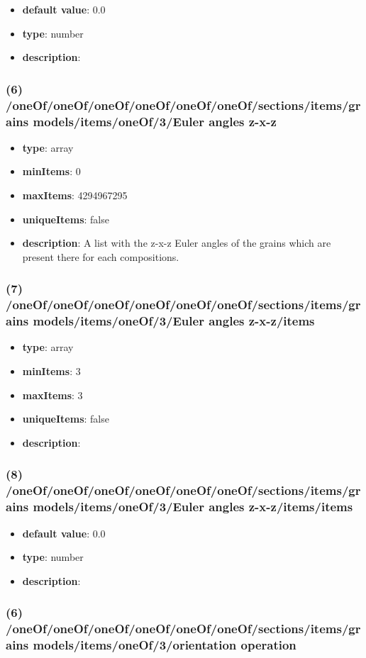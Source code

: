 \begin{itemize}[leftmargin=9em]\item {\bf default value}: 0.0
\item {\bf type}: number
\item {\bf description}: 
\end{itemize}\subsubsection{(6) /oneOf/oneOf/oneOf/oneOf/oneOf/oneOf/sections/items/grains models/items/oneOf/3/Euler angles z-x-z}
\begin{itemize}[leftmargin=6em]\item {\bf type}: array
\item {\bf minItems}: 0
\item {\bf maxItems}: 4294967295
\item {\bf uniqueItems}: false
\item {\bf description}: A list with the z-x-z Euler angles of the grains which are present there for each compositions.
\end{itemize}\subsubsection{(7) /oneOf/oneOf/oneOf/oneOf/oneOf/oneOf/sections/items/grains models/items/oneOf/3/Euler angles z-x-z/items}
\begin{itemize}[leftmargin=7em]\item {\bf type}: array
\item {\bf minItems}: 3
\item {\bf maxItems}: 3
\item {\bf uniqueItems}: false
\item {\bf description}: 
\end{itemize}\subsubsection{(8) /oneOf/oneOf/oneOf/oneOf/oneOf/oneOf/sections/items/grains models/items/oneOf/3/Euler angles z-x-z/items/items}
\begin{itemize}[leftmargin=8em]\item {\bf default value}: 0.0
\item {\bf type}: number
\item {\bf description}: 
\end{itemize}\subsubsection{(6) /oneOf/oneOf/oneOf/oneOf/oneOf/oneOf/sections/items/grains models/items/oneOf/3/orientation operation}
